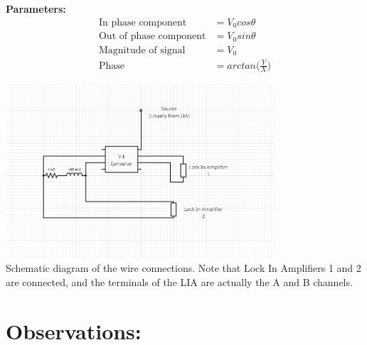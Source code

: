 \documentclass[]{report}[12 pt]
\begin{document}
\textbf{Parameters:}
\begin{align*}
	\text{In phase component}&=V_0cos\theta \\
	\text{Out of phase component}&=V_0sin\theta \\
	\text{Magnitude of signal}&=V_0\\
	\text{Phase}&=arctan\big(\frac{Y}{X}\big)
\end{align*}
\begin{center}
	\includegraphics[width=10cm]{lia4m.png}\\
	Schematic diagram of the wire connections. Note that Lock In Amplifiers 1 and 2 are connected, and the terminals of the LIA are actually the A and B channels.
\end{center}
	\section*{Observations:}
\end{document}
